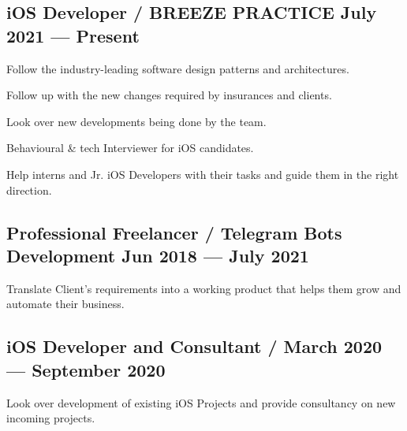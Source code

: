 \documentclass[letter,10pt]{article}
\begin{document}
\subsection{{iOS Developer / BREEZE PRACTICE \hfill July 2021 --- Present}}
\begin{zitemize}
\item Follow the industry-leading software design patterns and architectures.
\item Follow up with the new changes required by insurances and clients.
\item Look over new developments being done by the team.
\item Behavioural & tech Interviewer for iOS candidates.
\item Help interns and Jr. iOS Developers with their tasks and guide them in the right direction.
\end{zitemize}

\subsection{{Professional Freelancer / Telegram Bots Development \hfill Jun 2018 --- July 2021}}
\begin{zitemize}
\item Translate Client's requirements into a working product that helps them grow and automate their business.
\end{zitemize}

\subsection{{iOS Developer and Consultant / \hfill March 2020 --- September 2020}}
\begin{zitemize}
\item Look over development of existing iOS Projects and provide consultancy on new incoming projects.
\end{zitemize}
\end{document}
